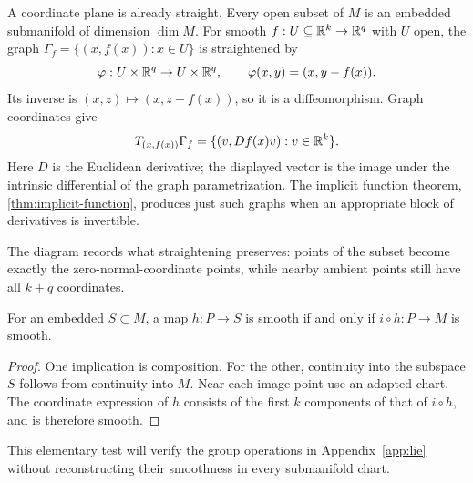 \begin{example}
A coordinate plane is already straight. Every open subset of $M$ is an
embedded submanifold of dimension $\dim M$. For smooth
$f:U\subseteq\mathbb{R}^k\to\mathbb{R}^q$ with $U$ open, the graph
$\Gamma_f=\{(x,f(x)):x\in U\}$ is straightened by
\[
\varphi:U\times\mathbb{R}^q\to U\times\mathbb{R}^q,\qquad
\varphi(x,y)=(x,y-f(x)).
\]
Its inverse is $(x,z)\mapsto(x,z+f(x))$, so it is a diffeomorphism.
Graph coordinates give
\[
T_{(x,f(x))}\Gamma_f=\{(v,Df(x)v):v\in\mathbb{R}^k\}.
\]
Here $D$ is the Euclidean derivative; the displayed vector is the image
under the intrinsic differential of the graph parametrization. The
implicit function theorem, \cref{thm:implicit-function}, produces just
such graphs when an appropriate block of derivatives is invertible.
\end{example}
\begin{center}
\end{center}
The diagram records what straightening preserves: points of the subset
become exactly the zero-normal-coordinate points, while nearby ambient
points still have all $k+q$ coordinates.

\begin{proposition}
For an embedded $S\subset M$, a map $h:P\to S$ is smooth if and only if
$i\circ h:P\to M$ is smooth.
\end{proposition}
\begin{proof}
One implication is composition. For the other, continuity into the
subspace $S$ follows from continuity into $M$. Near each image point use
an adapted chart. The coordinate expression of $h$ consists of the first
$k$ components of that of $i\circ h$, and is therefore smooth.
\end{proof}
This elementary test will verify the group operations in Appendix~\ref{app:lie}
without reconstructing their smoothness in every submanifold chart.

